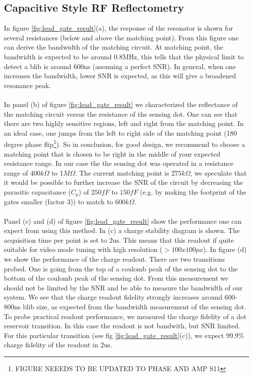 \documentclass{article}
\begin{document}

\subsection{Capacitive Style RF Reflectometry} %
\label{sub:capacitive_style_rf_reflectometry}
In figure \ref{fig:lead_gate_result}(a), the response of the resonator is shown for several resistances (below and above the matching point). From this figure one can derive the bandwidth of the matching circuit. At matching point, the bandwidth is expected to be around 0.8MHz, this tells that the physical limit to detect a blib is around 600ns (assuming a perfect SNR). In general, when one increases the bandwidth, lower SNR is expected, as this will give a broadened resonance peak.
\\ \\
In panel (b) of figure \ref{fig:lead_gate_result} we characterized the reflectance of the matching circuit versus the resistance of the sensing dot. One can see that there are two highly sensitive regions, left and right from the matching point. In an ideal case, one jumps from the left to right side of the matching point (180 degree phase flip\footnote{FIGURE NEEEDS TO BE UPDATED TO PHASE AND AMP S11}). So in conclusion, for good design, we recommend to choose a matching point that is chosen to be right in the middle of your expected resistance range. In our case the the sensing dot was operated in a resistance range of 400$k\Omega$ to 1$M\Omega$. The current matching point is $275k\Omega$, we speculate that it would be possible to further increase the SNR of the circuit by decreasing the parasitic capacitance ($C_p$) of $250fF$ to $150fF$ (e.g. by making the footprint of the gates smaller (factor 3)) to match to $600k\Omega$.
\\ \\
Panel (c) and (d) of figure \ref{fig:lead_gate_result} show the performance one can expect from using this method. In (c) a charge stability diagram is shown. The acquisition time per point is set to 2us. This means that this readout if quite suitable for video mode tuning with high resolution ($>100x100px$). In figure (d) we show the performance of the charge readout. There are two transitions probed. One is going from the top of a coulomb peak of the sensing dot to the bottom of the coulomb peak of the sensing dot. From this measurement we should not be limited by the SNR and be able to measure the bandwidth of our system. We see that the charge readout fidelity strongly increases around 600-800ns blib size, as expected from the bandwidth measurement of the sensing dot. To probe practical readout performance, we measured the charge fidelity of a dot reservoir transition. In this case the readout is not bandwith, but SNR limited. For this particular transition (see fig \ref{fig:lead_gate_result}(c)), we expect 99.9\% charge fidelity of the readout in 2us.
\end{document}
